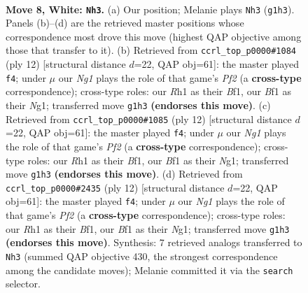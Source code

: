 \documentclass[11pt]{article}
\begin{document}
\begin{figure}[p]\centering
\begin{subfigure}{0.46\textwidth}\centering
\resizebox{\linewidth}{!}{%
\newchessgame
\chessboard[
  setfen={rnb1k2r/1ppnqppp/p3p3/3pP3/3P1P2/2N5/PPP3PP/R2QKBNR w KQkq - 0 8},
  showmover=false,
  pgfstyle=straightmove, color=movearrow, markmove={g1-h3}
]}
\caption{}
\end{subfigure}\hfill
\begin{subfigure}{0.46\textwidth}\centering
\resizebox{\linewidth}{!}{%
\newchessgame
\chessboard[
  setfen={rnb1k2r/pppnqppp/4p3/3pP3/3P4/2N5/PPP2PPP/R2QKBNR w KQkq - 0 7},
  showmover=false,
  pgfstyle=straightmove, color=movearrow, markmove={f2-f4}
]}
\caption{}
\end{subfigure}
\\[4pt]
\begin{subfigure}{0.46\textwidth}\centering
\resizebox{\linewidth}{!}{%
\newchessgame
\chessboard[
  setfen={rnb1k2r/pppnqppp/4p3/3pP3/3P4/2N5/PPP2PPP/R2QKBNR w KQkq - 0 7},
  showmover=false,
  pgfstyle=straightmove, color=movearrow, markmove={f2-f4}
]}
\caption{}
\end{subfigure}\hfill
\begin{subfigure}{0.46\textwidth}\centering
\resizebox{\linewidth}{!}{%
\newchessgame
\chessboard[
  setfen={rnb1k2r/pppnqppp/4p3/3pP3/3P4/2N5/PPP2PPP/R2QKBNR w KQkq - 0 7},
  showmover=false,
  pgfstyle=straightmove, color=movearrow, markmove={f2-f4}
]}
\caption{}
\end{subfigure}
\caption{\textbf{Move 8, White: \texttt{Nh3}.} (a) Our position; Melanie plays \texttt{Nh3} (\texttt{g1h3}). Panels (b)--(d) are the retrieved master positions whose correspondence most drove this move (highest QAP objective among those that transfer to it). (b) Retrieved from \texttt{ccrl\_top\_p0000\#1084} (ply 12) [structural distance $d$=22, QAP obj=61]: the master played \texttt{f4}; under $\mu$ our \emph{Ng1} plays the role of that game's \emph{Pf2} (a \textbf{cross-type} correspondence); cross-type roles: our \emph{R}h1 as their \emph{B}f1, our \emph{B}f1 as their \emph{N}g1; transferred move \texttt{g1h3} \textbf{(endorses this move)}. (c) Retrieved from \texttt{ccrl\_top\_p0000\#1085} (ply 12) [structural distance $d$=22, QAP obj=61]: the master played \texttt{f4}; under $\mu$ our \emph{Ng1} plays the role of that game's \emph{Pf2} (a \textbf{cross-type} correspondence); cross-type roles: our \emph{R}h1 as their \emph{B}f1, our \emph{B}f1 as their \emph{N}g1; transferred move \texttt{g1h3} \textbf{(endorses this move)}. (d) Retrieved from \texttt{ccrl\_top\_p0000\#2435} (ply 12) [structural distance $d$=22, QAP obj=61]: the master played \texttt{f4}; under $\mu$ our \emph{Ng1} plays the role of that game's \emph{Pf2} (a \textbf{cross-type} correspondence); cross-type roles: our \emph{R}h1 as their \emph{B}f1, our \emph{B}f1 as their \emph{N}g1; transferred move \texttt{g1h3} \textbf{(endorses this move)}. Synthesis: 7 retrieved analogs transferred to \texttt{Nh3} (summed QAP objective 430, the strongest correspondence among the candidate moves); Melanie committed it via the \texttt{search} selector.}
\label{fig:thought-m14}
\end{figure}
\end{document}
